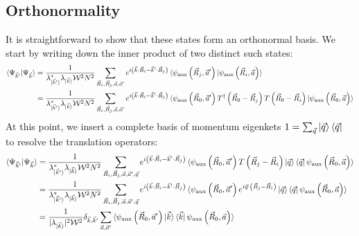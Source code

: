 \documentclass[prb]{revtex4-2}
\begin{document}
\subsection{Orthonormality}
It is straightforward to show that these states form an orthonormal basis. We start by writing down the inner product of two distinct such states:
\begin{equation}\begin{aligned}
	\braket{\Psi_{\vec k^\prime} | \Psi_{\vec k}} 
	&= \frac{1}{\lambda_{\ket{\vec k^\prime}}^* \lambda_{\ket{\vec k}} \mathcal{W}^2 N^2}\sum_{\vec R_i, \vec R_j, \vec a, \vec a^\prime} e^{i \left(\vec{k}\cdot\vec{R}_i - \vec{k}^\prime\cdot\vec{R}_j\right) } \braket{\psi_\text{aux}\left( \vec R_j, \vec a^\prime \right) | \psi_\text{aux}\left( \vec R_i, \vec a \right)} \\
	&= \frac{1}{\lambda_{\ket{\vec k^\prime}}^* \lambda_{\ket{\vec k}} \mathcal{W}^2 N^2}\sum_{\vec R_i, \vec R_j, \vec a, \vec a^\prime} e^{i \left(\vec{k}\cdot\vec{R}_i - \vec{k}^\prime\cdot\vec{R}_j\right) } \braket{\psi_\text{aux}\left( \vec R_0, \vec a^\prime \right) T^\dagger\left( \vec R_0 - \vec R_j \right) T\left( \vec R_0 - \vec R_i \right) | \psi_\text{aux}\left( \vec R_0, \vec a \right)}\\
\end{aligned}\end{equation}
At this point, we insert a complete basis of momentum eigenkets \(1 = \sum_{\vec q}\ket{\vec q}\bra{\vec q}\) to resolve the translation operators:
\begin{equation}\begin{aligned}
	\braket{\Psi_{\vec k^\prime} | \Psi_{\vec k}} &= \frac{1}{\lambda_{\ket{\vec k^\prime}}^* \lambda_{\ket{\vec k}} \mathcal{W}^2 N^2}\sum_{\vec R_i, \vec R_j, \vec a, \vec a^\prime, \vec q} e^{i \left(\vec{k}\cdot\vec{R}_i - \vec{k}^\prime\cdot\vec{R}_j\right) } \braket{\psi_\text{aux}\left( \vec R_0, \vec a^\prime \right) T\left( \vec R_j - \vec R_i \right) \ket{\vec q}\bra{\vec q} \psi_\text{aux}\left( \vec R_0, \vec a \right)}\\
						      &= \frac{1}{\lambda_{\ket{\vec k^\prime}}^* \lambda_{\ket{\vec k}} \mathcal{W}^2 N^2}\sum_{\vec R_i, \vec R_j, \vec a, \vec a^\prime, \vec q} e^{i \left(\vec{k}\cdot\vec{R}_i - \vec{k}^\prime\cdot\vec{R}_j\right) } \braket{\psi_\text{aux}\left( \vec R_0, \vec a^\prime \right) e^{i \vec q \cdot \left( \vec R_j - \vec R_i \right)} \ket{\vec q}\bra{\vec q} \psi_\text{aux}\left( \vec R_0, \vec a \right)} \\
						      &= \frac{1}{|\lambda_{\ket{\vec k}}|^2 \mathcal{W}^2} \delta_{\vec k, \vec k^\prime}\sum_{\vec a, \vec a^\prime}\braket{\psi_\text{aux}\left( \vec R_0, \vec a^\prime \right) \ket{\vec k}\bra{\vec k} \psi_\text{aux}\left( \vec R_0, \vec a \right)}\\
\end{aligned}\end{equation}
\end{document}

